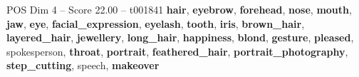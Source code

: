 \begin{textsample}{POS Dim 4 – Score 22.00 – t001841}  \label{ex:f4_pos_012}
\textbf{hair}, \textbf{eyebrow}, \textbf{forehead}, \textbf{nose}, \textbf{mouth}, \textbf{jaw}, \textbf{eye}, \textbf{facial\_expression}, \textbf{eyelash}, \textbf{tooth}, \textbf{iris}, \textbf{brown\_hair}, \textbf{layered\_hair}, \textbf{jewellery}, \textbf{long\_hair}, \textbf{happiness}, \textbf{blond}, \textbf{gesture}, \textbf{pleased}, spokesperson, \textbf{throat}, \textbf{portrait}, \textbf{feathered\_hair}, \textbf{portrait\_photography}, \textbf{step\_cutting}, speech, \textbf{makeover}

\end{textsample}
